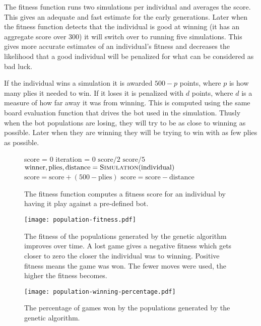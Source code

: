 \documentclass[a4paper,11pt]{article}
\begin{document}
The fitness function runs two simulations per individual and averages
the score. This gives an adequate and fast estimate for the early
generations. Later when the fitness function detects that the
individual is good at winning (it has an aggregate score over $300$)
it will switch over to running five simulations. This gives more
accurate estimates of an individual's fitness and decreases the
likelihood that a good individual will be penalized for what can be
considered as bad luck.

If the individual wins a simulation it is awarded $500-p$ points,
where $p$ is how many plies it needed to win. If it loses it is
penalized with $d$ points, where $d$ is a measure of how far away it
was from winning. This is computed using the same board evaluation
function that drives the bot used in the simulation. Thusly when the
bot populations are losing, they will try to be as close to winning as
possible. Later when they are winning they will be trying to win with
as few plies as possible.

\begin{figure}
\begin{algorithmic}
\State score = 0
\State iteration = 0
\While{$\top$}
   \State \Return $\textrm{score} / 2$
   \State \Return $\textrm{score} / 5$
 \EndIf
 \State $\textrm{winner}, \textrm{plies}, \textrm{distance} = \textsc{Simulation}(\textrm{individual})$
   \State $\textrm{score} = \textrm{score} + (500 - \textrm{plies})$
 \Else
   \State $\textrm{score} = \textrm{score} - \textrm{distance}$
 \EndIf
\EndWhile
\EndFunction
\end{algorithmic}
\caption{The fitness function computes a fitness score for an
  individual by having it play against a pre-defined bot.}
\label{fitnessfn}
\end{figure}


\begin{figure}
\centering
\texttt{[image: population-fitness.pdf]}
\caption{The fitness of the populations generated by the genetic
  algorithm improves over time. A lost game gives a negative fitness
  which gets closer to zero the closer the individual was to winning.
  Positive fitness means the game was won. The fewer moves were
  used, the higher the fitness becomes.}
\label{fitness}
\end{figure}

\begin{figure}
\centering
\texttt{[image: population-winning-percentage.pdf]}
\caption{The percentage of games won by the populations generated by
  the genetic algorithm.}
\label{winning}
\end{figure}
\end{document}
